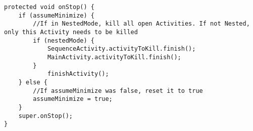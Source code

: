 \begin{lstlisting}[caption={onStop with the check for assumeMinimize}, label={lst:assumeMinimize}]
protected void onStop() {
    if (assumeMinimize) {
        //If in NestedMode, kill all open Activities. If not Nested, only this Activity needs to be killed
        if (nestedMode) {
            SequenceActivity.activityToKill.finish();
            MainActivity.activityToKill.finish();
        }
            finishActivity();
    } else {
        //If assumeMinimize was false, reset it to true
        assumeMinimize = true;
    }
    super.onStop();
}
\end{lstlisting}